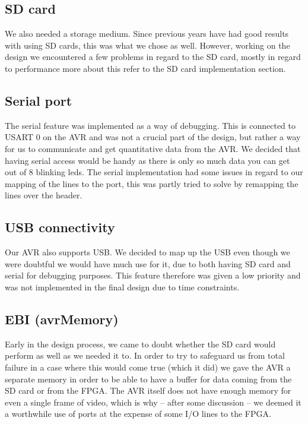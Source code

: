 \subsection{SD card} %

We also needed a storage medium. Since previous years have had good results with
using \ac{SD} cards, this was what we chose as well. However, working on the
design we encountered a few problems in regard to the \ac{SD} card, mostly in
regard to performance more about this refer to the \ac{SD} card implementation
section. 

\subsection{Serial port}

The serial feature was implemented as a way of debugging. This is connected to
\ac{USART} 0 on the AVR and was not a crucial part of the design, but rather a way for us to communicate and get quantitative data from the AVR. We decided that having serial access would be handy as there is only so much data you can get out of 8 blinking leds. The serial implementation had some issues in regard to our mapping of the lines to the port, this was partly tried to solve by remapping the lines over the header.

\subsection{USB connectivity}

Our AVR also supports \ac{USB}. We decided to map up the \ac{USB} even though we were doubtful we would have much use for it, due to both having \ac{SD} card and serial for debugging purposes. This feature therefore was given a low priority and was not implemented in the final design due to time constraints.
 
\subsection{EBI (avrMemory)}

Early in the design process, we came to doubt whether the \ac{SD} card would perform as well as we needed it to. In order to try to safeguard us from total failure in a case where this would come true (which it did) we gave the AVR a separate memory in order to be able to have a buffer for data coming from the \ac{SD} card or from the \ac{FPGA}. The AVR itself does not have enough memory for even a single frame of video, which is why -- after some discussion -- we deemed it a worthwhile use of ports at the expense of some \ac{I/O} lines to the FPGA.

